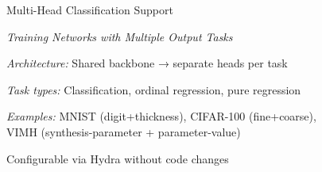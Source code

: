 




\begin{slide}[\slideopts,toc={MultiHead}]{Multi-Head Classification Support}

  \vspace{-1em}
  
  \scalebox{0.7}{
    
  }

  \emph{Training Networks with Multiple Output Tasks}
  
  \begin{itemize}
    \mpitem \emph{Architecture:} Shared backbone → separate heads per task
    
    \mpitem \emph{Task types:} Classification, ordinal regression, pure regression
    
    \mpitem \emph{Examples:} MNIST (digit+thickness), CIFAR-100 (fine+coarse),\\
    VIMH (synthesis-parameter + parameter-value)
    
    \mpitem Configurable via Hydra without code changes
  \end{itemize}
\end{slide}

